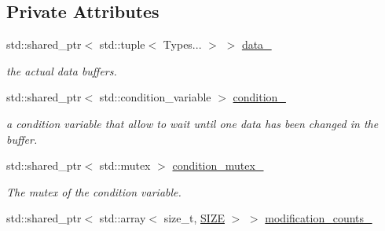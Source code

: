 \subsection*{Private Attributes}
\begin{DoxyCompactItemize}
\item 
\mbox{\label{classreal__time__tools_1_1ThreadsafeObject_a16c0a205e6ca31f7017e56b40831a117}} 
std\+::shared\+\_\+ptr$<$ std\+::tuple$<$ Types... $>$ $>$ \hyperlink{classreal__time__tools_1_1ThreadsafeObject_a16c0a205e6ca31f7017e56b40831a117}{data\+\_\+}
\begin{DoxyCompactList}\small\item\em the actual data buffers. \end{DoxyCompactList}\item 
\mbox{\label{classreal__time__tools_1_1ThreadsafeObject_a0f39feab7508852adab81ad4318f47e6}} 
std\+::shared\+\_\+ptr$<$ std\+::condition\+\_\+variable $>$ \hyperlink{classreal__time__tools_1_1ThreadsafeObject_a0f39feab7508852adab81ad4318f47e6}{condition\+\_\+}
\begin{DoxyCompactList}\small\item\em a condition variable that allow to wait until one data has been changed in the buffer. \end{DoxyCompactList}\item 
\mbox{\label{classreal__time__tools_1_1ThreadsafeObject_a202a8fd66fe64138bc0cfa35a8dd745e}} 
std\+::shared\+\_\+ptr$<$ std\+::mutex $>$ \hyperlink{classreal__time__tools_1_1ThreadsafeObject_a202a8fd66fe64138bc0cfa35a8dd745e}{condition\+\_\+mutex\+\_\+}
\begin{DoxyCompactList}\small\item\em The mutex of the condition variable. \end{DoxyCompactList}\item 
\mbox{\label{classreal__time__tools_1_1ThreadsafeObject_a20e108057d1da31ebc416d5b3577ac21}} 
std\+::shared\+\_\+ptr$<$ std\+::array$<$ size\+\_\+t, \hyperlink{classreal__time__tools_1_1ThreadsafeObject_af05c02b66f0b75ea12cde9274bc2a97d}{S\+I\+ZE} $>$ $>$ \hyperlink{classreal__time__tools_1_1ThreadsafeObject_a20e108057d1da31ebc416d5b3577ac21}{modification\+\_\+counts\+\_\+}

\end{DoxyCompactItemize}
